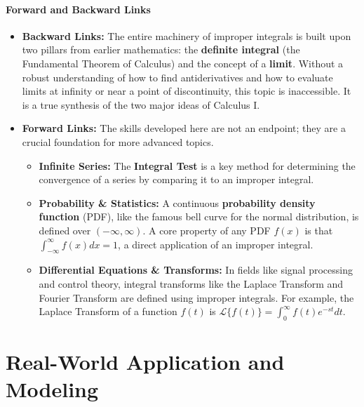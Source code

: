 \documentclass{article}
\begin{document}
\subsection{Forward and Backward Links}
\begin{itemize}
    \item \textbf{Backward Links:} The entire machinery of improper integrals is built upon two pillars from earlier mathematics: the \textbf{definite integral} (the Fundamental Theorem of Calculus) and the concept of a \textbf{limit}. Without a robust understanding of how to find antiderivatives and how to evaluate limits at infinity or near a point of discontinuity, this topic is inaccessible. It is a true synthesis of the two major ideas of Calculus I.
    \item \textbf{Forward Links:} The skills developed here are not an endpoint; they are a crucial foundation for more advanced topics.
    \begin{itemize}
        \item \textbf{Infinite Series:} The \textbf{Integral Test} is a key method for determining the convergence of a series by comparing it to an improper integral.
        \item \textbf{Probability \& Statistics:} A continuous \textbf{probability density function} (PDF), like the famous bell curve for the normal distribution, is defined over $(-\infty, \infty)$. A core property of any PDF $f(x)$ is that $\int_{-\infty}^\infty f(x) dx = 1$, a direct application of an improper integral.
        \item \textbf{Differential Equations \& Transforms:} In fields like signal processing and control theory, integral transforms like the Laplace Transform and Fourier Transform are defined using improper integrals. For example, the Laplace Transform of a function $f(t)$ is $\mathcal{L}\{f(t)\} = \int_0^\infty f(t)e^{-st} dt$.
    \end{itemize}
\end{itemize}

\part{Real-World Application and Modeling}
\end{document}
